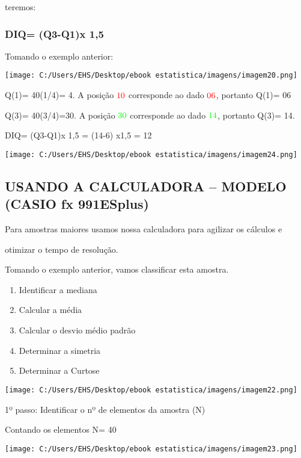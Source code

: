 \documentclass[]{book}
\begin{document}
teremos:

\hypertarget{diq-q3-q1x-15}{%
\subsubsection{DIQ= (Q3-Q1)x 1,5}\label{diq-q3-q1x-15}}

Tomando o exemplo anterior:

\texttt{[image: C:/Users/EHS/Desktop/ebook estatistica/imagens/imagem20.png]}

Q(1)= 40(1/4)= 4. A posição \(\color{red}{\text{10}}\) corresponde ao dado \(\color{red}{\text{06}}\), portanto Q(1)= 06

Q(3)= 40(3/4)=30. A posição \(\color{green}{\text{30}}\) corresponde ao dado \(\color{green}{\text{14}}\), portanto Q(3)= 14.

DIQ= (Q3-Q1)x 1,5 = (14-6) x1,5 = 12

\texttt{[image: C:/Users/EHS/Desktop/ebook estatistica/imagens/imagem24.png]}

\hypertarget{usando-a-calculadora-modelo-casio-fx-991esplus}{%
\subsection{USANDO A CALCULADORA -- MODELO (CASIO fx 991ESplus)}\label{usando-a-calculadora-modelo-casio-fx-991esplus}}

Para amostras maiores usamos nossa calculadora para agilizar os cálculos e

otimizar o tempo de resolução.

Tomando o exemplo anterior, vamos classificar esta amostra.

\begin{enumerate}
\def\labelenumi{\alph{enumi})}
\item
  Identificar a mediana
\item
  Calcular a média
\item
  Calcular o desvio médio padrão
\item
  Determinar a simetria
\item
  Determinar a Curtose
\end{enumerate}

\texttt{[image: C:/Users/EHS/Desktop/ebook estatistica/imagens/imagem22.png]}

1º passo: Identificar o nº de elementos da amostra (N)

Contando os elementos N= 40

\texttt{[image: C:/Users/EHS/Desktop/ebook estatistica/imagens/imagem23.png]}
\end{document}
